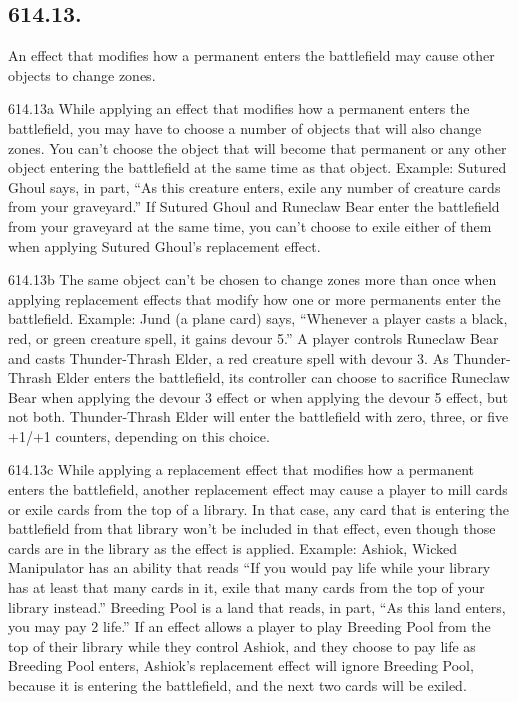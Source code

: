 \subsection*{614.13.}
An effect that modifies how a permanent enters the battlefield may cause other objects to change zones.

614.13a While applying an effect that modifies how a permanent enters the battlefield, you may have to choose a number of objects that will also change zones. You can’t choose the object that will become that permanent or any other object entering the battlefield at the same time as that object.
Example: Sutured Ghoul says, in part, “As this creature enters, exile any number of creature cards from your graveyard.” If Sutured Ghoul and Runeclaw Bear enter the battlefield from your graveyard at the same time, you can’t choose to exile either of them when applying Sutured Ghoul’s replacement effect.

614.13b The same object can’t be chosen to change zones more than once when applying replacement effects that modify how one or more permanents enter the battlefield.
Example: Jund (a plane card) says, “Whenever a player casts a black, red, or green creature spell, it gains devour 5.” A player controls Runeclaw Bear and casts Thunder-Thrash Elder, a red creature spell with devour 3. As Thunder-Thrash Elder enters the battlefield, its controller can choose to sacrifice Runeclaw Bear when applying the devour 3 effect or when applying the devour 5 effect, but not both. Thunder-Thrash Elder will enter the battlefield with zero, three, or five +1/+1 counters, depending on this choice.

614.13c While applying a replacement effect that modifies how a permanent enters the battlefield, another replacement effect may cause a player to mill cards or exile cards from the top of a library. In that case, any card that is entering the battlefield from that library won’t be included in that effect, even though those cards are in the library as the effect is applied.
Example: Ashiok, Wicked Manipulator has an ability that reads “If you would pay life while your library has at least that many cards in it, exile that many cards from the top of your library instead.” Breeding Pool is a land that reads, in part, “As this land enters, you may pay 2 life.” If an effect allows a player to play Breeding Pool from the top of their library while they control Ashiok, and they choose to pay life as Breeding Pool enters, Ashiok’s replacement effect will ignore Breeding Pool, because it is entering the battlefield, and the next two cards will be exiled.


